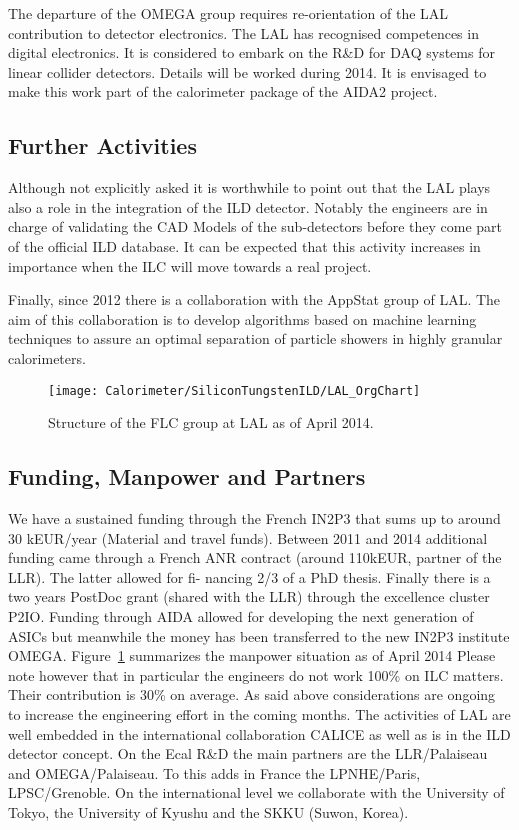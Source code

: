 The departure of the OMEGA group requires re-orientation of the LAL contribution to detector electronics. The LAL has recognised competences in digital electronics. It is considered to embark on the R\&D for DAQ systems for linear collider detectors. Details will be worked during 2014. It is envisaged to make this work part of the calorimeter package of the AIDA2 project.

\subsection{Further Activities}
Although not explicitly asked it is worthwhile to point out that the LAL plays also a role in the integration of the ILD detector. Notably the engineers are in charge of validating the CAD Models of the sub-detectors before they come part of the official ILD database. It can be expected that this activity increases in importance when the ILC will move towards a real project.

Finally, since 2012 there is a collaboration with the AppStat group of LAL. The aim of this collaboration is to develop algorithms based on machine learning techniques to assure an optimal separation of particle showers in highly granular calorimeters.
\begin{figure}
	\centering
	\texttt{[image: Calorimeter/SiliconTungstenILD/LAL\_OrgChart]}
	\caption{Structure of the FLC group at LAL as of April 2014.}
	\label{fig:Calorimeter:LALOrgchart}
\end{figure}
\subsection{Funding, Manpower and Partners}
We have a sustained funding through the French IN2P3 that sums up to around 30 kEUR/year (Material and travel funds). Between 2011 and 2014 additional funding came through a French ANR contract (around 110kEUR, partner of the LLR). The latter allowed for fi- nancing 2/3 of a PhD thesis. Finally there is a two years PostDoc grant (shared with the LLR) through the excellence cluster P2IO. Funding through AIDA allowed for developing the next generation of ASICs but meanwhile the money has been transferred to the new IN2P3 institute OMEGA.
Figure~\ref{fig:Calorimeter:LALOrgchart} summarizes the manpower situation as of April 2014 Please note however that in particular the engineers do not work 100\% on ILC matters. Their contribution is 30\% on average. As said above considerations are ongoing to increase the engineering effort in the coming months.
The activities of LAL are well embedded in the international collaboration CALICE as well as is in the ILD detector concept.
On the Ecal R\&D the main partners are the LLR/Palaiseau and OMEGA/Palaiseau. To this adds in France the LPNHE/Paris, LPSC/Grenoble. On the international level we collaborate with the University of Tokyo, the University of Kyushu and  the SKKU (Suwon, Korea).
